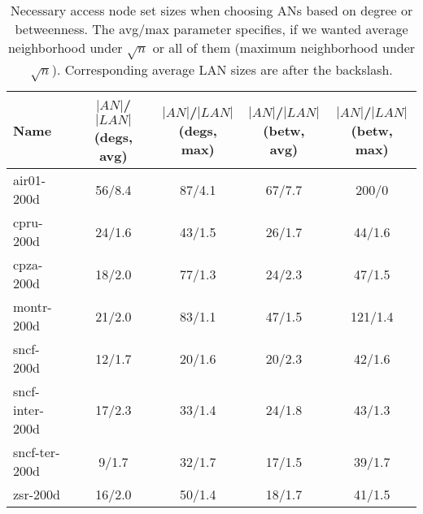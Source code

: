 	\begin{table}[h!]{
		\scriptsize
	    \begin{tabular}{l|c|c|c|c}
		\hline
			\rowcolor{tablehead}
	           	\textbf{Name} & 
	           	\textbf{$|AN|$/$|LAN|$ (degs, avg)} &
	           	\textbf{$|AN|$/$|LAN|$ (degs, max)} &
	           	\textbf{$|AN|$/$|LAN|$ (betw, avg)} &
	           	\textbf{$|AN|$/$|LAN|$ (betw, max)} \\
	        \hline
		        air01-200d & 56/8.4 & 87/4.1 & 67/7.7 & 200/0 \\
				cpru-200d & 24/1.6 & 43/1.5 & 26/1.7 & 44/1.6 \\
				cpza-200d & 18/2.0 & 77/1.3 & 24/2.3 & 47/1.5 \\
				montr-200d & 21/2.0 & 83/1.1 & 47/1.5 & 121/1.4 \\
				sncf-200d & 12/1.7 & 20/1.6 & 20/2.3 & 42/1.6 \\
				sncf-inter-200d & 17/2.3 & 33/1.4 & 24/1.8 & 43/1.3 \\
				sncf-ter-200d & 9/1.7 & 32/1.7 & 17/1.5 & 39/1.7 \\
				zsr-200d & 16/2.0 & 50/1.4 & 18/1.7 & 41/1.5 \\
	        \end{tabular}}
		\caption{\label{tab:anbetwdegs} Necessary access node set sizes when choosing ANs based on degree or betweenness. The avg/max parameter specifies, if we wanted average neighborhood under $\sqrt{n}$ or all of them (maximum neighborhood under $\sqrt{n}$). Corresponding average LAN sizes are after the backslash.}
	        \normalsize
	\end{table}